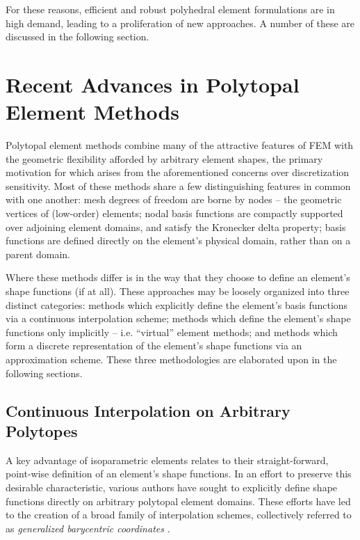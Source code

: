 	For these reasons, efficient and robust polyhedral element formulations are in high demand, leading to a proliferation of new approaches. A number of these are discussed in the following section.

\section{Recent Advances in Polytopal Element Methods} %

	Polytopal element methods combine many of the attractive features of FEM with the geometric flexibility afforded by arbitrary element shapes, the primary motivation for which arises from the aforementioned concerns over discretization sensitivity. Most of these methods share a few distinguishing features in common with one another: mesh degrees of freedom are borne by nodes -- the geometric vertices of (low-order) elements; nodal basis functions are compactly supported over adjoining element domains, and satisfy the Kronecker delta property; basis functions are defined directly on the element's physical domain, rather than on a parent domain.
	
	
	Where these methods differ is in the way that they choose to define an element's shape functions (if at all). These approaches may be loosely organized into three distinct categories: methods which explicitly define the element's basis functions via a continuous interpolation scheme; methods which define the element's shape functions only implicitly -- i.e. ``virtual'' element methods; and methods which form a discrete representation of the element's shape functions via an approximation scheme. These three methodologies are elaborated upon in the following sections.

	\subsection*{Continuous Interpolation on Arbitrary Polytopes}
		A key advantage of isoparametric elements relates to their straight-forward, point-wise definition of an element's shape functions. In an effort to preserve this desirable characteristic, various authors have sought to explicitly define shape functions directly on arbitrary polytopal element domains. These efforts have led to the creation of a broad family of interpolation schemes, collectively referred to as \textit{generalized barycentric coordinates} \cite{Sukumar:17}.
		
